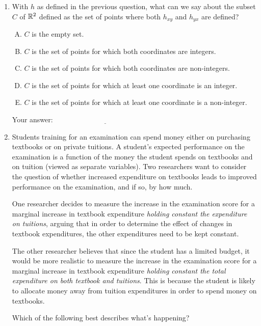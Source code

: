 \documentclass[10pt]{amsart}
\begin{document}
\begin{enumerate}
\item With $h$ as defined in the previous question, what can we say
  about the subset $C$ of $\mathbb{R}^2$ defined as the set of points where
  both $h_{xy}$ and $h_{yx}$ are defined?

  \begin{enumerate}[(A)]
  \item $C$ is the empty set.
  \item $C$ is the set of points for which both coordinates are integers.
  \item $C$ is the set of points for which both coordinates are non-integers.
  \item $C$ is the set of points for which at least one coordinate is an integer.
  \item $C$ is the set of points for which at least one coordinate is
    a non-integer.
  \end{enumerate}

  \vspace{0.05in}
  Your answer: $\underline{\qquad\qquad\qquad\qquad\qquad\qquad\qquad}$
  \vspace{0.05in}

\item Students training for an examination can spend money either on
  purchasing textbooks or on private tuitions. A student's expected
  performance on the examination is a function of the money the
  student spends on textbooks and on tuition (viewed as separate
  variables). Two researchers want to consider the question of whether
  increased expenditure on textbooks leads to improved performance on
  the examination, and if so, by how much.

  One researcher decides to measure the increase in the examination
  score for a marginal increase in textbook expenditure {\em holding
  constant the expenditure on tuitions}, arguing that in order to
  determine the effect of changes in textbook expenditures, the other
  expenditures need to be kept constant.

  The other researcher believes that since the student has a limited
  budget, it would be more realistic to measure the increase in the
  examination score for a marginal increase in textbook expenditure
  {\em holding constant the total expenditure on both textbook and
  tuitions}. This is because the student is likely to allocate money
  away from tuition expenditures in order to spend money on textbooks.

  Which of the following best describes what's happening?


\end{enumerate}
\end{document}
